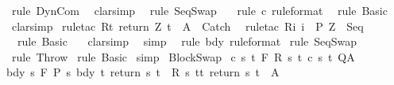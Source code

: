 \begin{isabellebody}
\isamarkupfalse%
\ \ {\isacharparenleft}rule\ DynCom{\isacharparenright}\isanewline
{}\isamarkupfalse%
\ \ {\isacharparenleft}clarsimp{\isacharparenright}\isanewline
{}\isamarkupfalse%
\ \ {\isacharparenleft}rule\ SeqSwap{\isacharparenright}\isanewline
{}\isamarkupfalse%
\ \ \ {\isacharparenleft}rule\ c\ {\isacharbrackleft}rule{\isacharunderscore}format{\isacharbrackright}{\isacharparenright}\isanewline
{}\isamarkupfalse%
\ \ {\isacharparenleft}rule\ Basic{\isacharparenright}\isanewline
{}\isamarkupfalse%
\ \ clarsimp\isanewline
{}\isamarkupfalse%
\ {\isacharparenleft}rule{\isacharunderscore}tac\ R{\isacharequal}{\isachardoublequoteopen}{\isacharbraceleft}t{\isachardot}\ return\ Z\ t\ {\isasymin}\ A{\isacharbraceright}{\isachardoublequoteclose}\ \ Catch{\isacharparenright}\isanewline
{}\isamarkupfalse%
\ \ {\isacharparenleft}rule{\isacharunderscore}tac\ R{\isacharequal}{\isachardoublequoteopen}{\isacharbraceleft}i{\isachardot}\ i\ {\isasymin}\ P{\isacharprime}\ Z{\isacharbraceright}{\isachardoublequoteclose}\ \ Seq{\isacharparenright}\isanewline
{}\isamarkupfalse%
\ \ \ {\isacharparenleft}rule\ Basic{\isacharparenright}\isanewline
{}\isamarkupfalse%
\ \ \ clarsimp\isanewline
{}\isamarkupfalse%
\ \ simp\isanewline
{}\isamarkupfalse%
\ \ {\isacharparenleft}rule\ bdy\ {\isacharbrackleft}rule{\isacharunderscore}format{\isacharbrackright}{\isacharparenright}\isanewline
{}\isamarkupfalse%
\ {\isacharparenleft}rule\ SeqSwap{\isacharparenright}\isanewline
{}\isamarkupfalse%
\ \ {\isacharparenleft}rule\ Throw{\isacharparenright}\isanewline
{}\isamarkupfalse%
\ {\isacharparenleft}rule\ Basic{\isacharparenright}\isanewline
{}\isamarkupfalse%
\ simp\isanewline
{}\isamarkupfalse%
%
\endisatagproof
{\isafoldproof}%
%
\isadelimproof
\isanewline
%
\endisadelimproof
\isanewline
\isanewline
{}\isamarkupfalse%
\ BlockSwap{\isacharcolon}\isanewline
{}\ c{\isacharcolon}\ {\isachardoublequoteopen}{\isasymforall}s\ t{\isachardot}\ {\isasymGamma}{\isacharcomma}{\isasymTheta}{\isasymturnstile}\isactrlbsub {\isacharslash}F\isactrlesub \ {\isacharparenleft}R\ s\ t{\isacharparenright}\ {\isacharparenleft}c\ s\ t{\isacharparenright}\ Q{\isacharcomma}A{\isachardoublequoteclose}\isanewline
{}\ bdy{\isacharcolon}\ {\isachardoublequoteopen}{\isasymforall}s{\isachardot}\ {\isasymGamma}{\isacharcomma}{\isasymTheta}{\isasymturnstile}\isactrlbsub {\isacharslash}F\isactrlesub \ {\isacharparenleft}P{\isacharprime}\ s{\isacharparenright}\ bdy\ {\isacharbraceleft}t{\isachardot}\ return\ s\ t\ {\isasymin}\ R\ s\ t{\isacharbraceright}{\isacharcomma}{\isacharbraceleft}t{\isachardot}\ return\ s\ t\ {\isasymin}\ A{\isacharbraceright}{\isachardoublequoteclose}\isanewline

\end{isabellebody}

